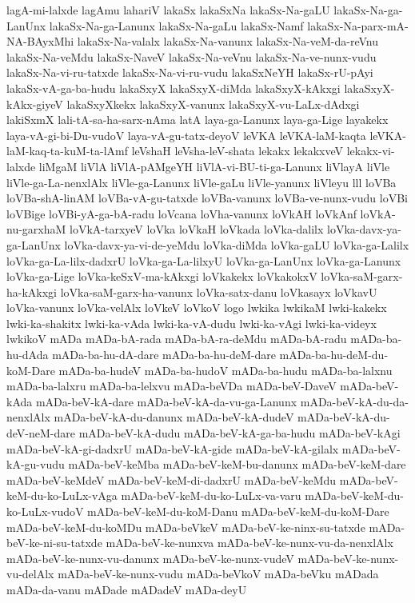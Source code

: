 {lagA-mi-lalxde
lagAmu
lahariV
lakaSx
lakaSxNa
lakaSx-Na-gaLU
lakaSx-Na-ga-LanUnx
lakaSx-Na-ga-Lanunx
lakaSx-Na-gaLu
lakaSx-Namf
lakaSx-Na-parx-mA-NA-BAyxMhi
lakaSx-Na-valalx
lakaSx-Na-vanunx
lakaSx-Na-veM-da-reVnu
lakaSx-Na-veMdu
lakaSx-NaveV
lakaSx-Na-veVnu
lakaSx-Na-ve-nunx-vudu
lakaSx-Na-vi-ru-tatxde
lakaSx-Na-vi-ru-vudu
lakaSxNeYH
lakaSx-rU-pAyi
lakaSx-vA-ga-ba-hudu
lakaSxyX
lakaSxyX-diMda
lakaSxyX-kAkxgi
lakaSxyX-kAkx-giyeV
lakaSxyXkekx
lakaSxyX-vanunx
lakaSxyX-vu-LaLx-dAdxgi
lakiSxmX
lali-tA-sa-ha-sarx-nAma
latA
laya-ga-Lanunx
laya-ga-Lige
layakekx
laya-vA-gi-bi-Du-vudoV
laya-vA-gu-tatx-deyoV
leVKA
leVKA-laM-kaqta
leVKA-laM-kaq-ta-kuM-ta-lAmf
leVshaH
leVsha-leV-shata
lekakx
lekakxveV
lekakx-vi-lalxde
liMgaM
liVlA
liVlA-pAMgeYH
liVlA-vi-BU-ti-ga-Lanunx
liVlayA
liVle
liVle-ga-La-nenxlAlx
liVle-ga-Lanunx
liVle-gaLu
liVle-yanunx
liVleyu
lll
loVBa
loVBa-shA-linAM
loVBa-vA-gu-tatxde
loVBa-vanunx
loVBa-ve-nunx-vudu
loVBi
loVBige
loVBi-yA-ga-bA-radu
loVcana
loVha-vanunx
loVkAH
loVkAnf
loVkA-nu-garxhaM
loVkA-tarxyeV
loVka
loVkaH
loVkada
loVka-dalilx
loVka-davx-ya-ga-LanUnx
loVka-davx-ya-vi-de-yeMdu
loVka-diMda
loVka-gaLU
loVka-ga-Lalilx
loVka-ga-La-lilx-dadxrU
loVka-ga-La-lilxyU
loVka-ga-LanUnx
loVka-ga-Lanunx
loVka-ga-Lige
loVka-keSxV-ma-kAkxgi
loVkakekx
loVkakokxV
loVka-saM-garx-ha-kAkxgi
loVka-saM-garx-ha-vanunx
loVka-satx-danu
loVkasayx
loVkavU
loVka-vanunx
loVka-velAlx
loVkeV
loVkoV
logo
lwkika
lwkikaM
lwki-kakekx
lwki-ka-shakitx
lwki-ka-vAda
lwki-ka-vA-dudu
lwki-ka-vAgi
lwki-ka-videyx
lwkikoV
mADa
mADa-bA-rada
mADa-bA-ra-deMdu
mADa-bA-radu
mADa-ba-hu-dAda
mADa-ba-hu-dA-dare
mADa-ba-hu-deM-dare
mADa-ba-hu-deM-du-koM-Dare
mADa-ba-hudeV
mADa-ba-hudoV
mADa-ba-hudu
mADa-ba-lalxnu
mADa-ba-lalxru
mADa-ba-lelxvu
mADa-beVDa
mADa-beV-DaveV
mADa-beV-kAda
mADa-beV-kA-dare
mADa-beV-kA-da-vu-ga-Lanunx
mADa-beV-kA-du-da-nenxlAlx
mADa-beV-kA-du-danunx
mADa-beV-kA-dudeV
mADa-beV-kA-du-deV-neM-dare
mADa-beV-kA-dudu
mADa-beV-kA-ga-ba-hudu
mADa-beV-kAgi
mADa-beV-kA-gi-dadxrU
mADa-beV-kA-gide
mADa-beV-kA-gilalx
mADa-beV-kA-gu-vudu
mADa-beV-keMba
mADa-beV-keM-bu-danunx
mADa-beV-keM-dare
mADa-beV-keMdeV
mADa-beV-keM-di-dadxrU
mADa-beV-keMdu
mADa-beV-keM-du-ko-LuLx-vAga
mADa-beV-keM-du-ko-LuLx-va-varu
mADa-beV-keM-du-ko-LuLx-vudoV
mADa-beV-keM-du-koM-Danu
mADa-beV-keM-du-koM-Dare
mADa-beV-keM-du-koMDu
mADa-beVkeV
mADa-beV-ke-ninx-su-tatxde
mADa-beV-ke-ni-su-tatxde
mADa-beV-ke-nunxva
mADa-beV-ke-nunx-vu-da-nenxlAlx
mADa-beV-ke-nunx-vu-danunx
mADa-beV-ke-nunx-vudeV
mADa-beV-ke-nunx-vu-delAlx
mADa-beV-ke-nunx-vudu
mADa-beVkoV
mADa-beVku
mADada
mADa-da-vanu
mADade
mADadeV
mADa-deyU
}
